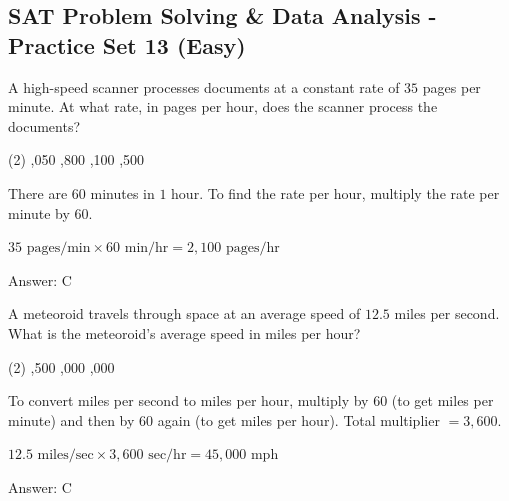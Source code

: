 \documentclass[11pt,paper=a4,answers]{exam}
\begin{document}
\begin{questions}
\pointsinrightmargin
\pointsdroppedatright
\marksnotpoints
{}
\pointformat{\boldmath\themarginpoints}
\bracketedpoints


\section*{SAT Problem Solving \& Data Analysis - Practice Set 13 (Easy)}

\question
A high-speed scanner processes documents at a constant rate of $35$ pages per minute. At what rate, in pages per hour, does the scanner process the documents?
\begin{tasks}(2)
    ,050
    ,800
    ,100
    ,500
\end{tasks}

\begin{solution}
There are $60$ minutes in $1$ hour. To find the rate per hour, multiply the rate per minute by $60$.
\vspace{5pt}
\begin{center}
$35 \text{ pages/min} \times 60 \text{ min/hr} = 2,100 \text{ pages/hr}$
\end{center}
\vspace{5pt}
Answer: \colorbox{yellow!100}{C}
\end{solution}

\vspace{1cm}

\question
A meteoroid travels through space at an average speed of $12.5$ miles per second. What is the meteoroid's average speed in miles per hour?
\begin{tasks}(2)
    ,500
    ,000
    ,000
\end{tasks}

\begin{solution}
To convert miles per second to miles per hour, multiply by $60$ (to get miles per minute) and then by $60$ again (to get miles per hour). Total multiplier $= 3,600$.
\vspace{5pt}
\begin{center}
$12.5 \text{ miles/sec} \times 3,600 \text{ sec/hr} = 45,000 \text{ mph}$
\end{center}
\vspace{5pt}
Answer: \colorbox{yellow!100}{C}
\end{solution}


\end{questions}
\end{document}
